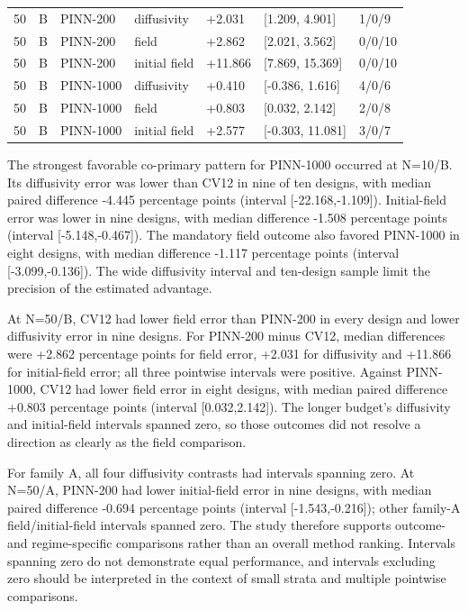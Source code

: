 \documentclass[10pt,a4paper]{article}
\begin{document}
\begin{longtable}{@{}p{}p{}p{}p{}p{}p{}p{}@{}}
50 & B & PINN-200 & diffusivity & +2.031 & [1.209, 4.901] & 1/0/9 \\
50 & B & PINN-200 & field & +2.862 & [2.021, 3.562] & 0/0/10 \\
50 & B & PINN-200 & initial field & +11.866 & [7.869, 15.369] & 0/0/10 \\
50 & B & PINN-1000 & diffusivity & +0.410 & [-0.386, 1.616] & 4/0/6 \\
50 & B & PINN-1000 & field & +0.803 & [0.032, 2.142] & 2/0/8 \\
50 & B & PINN-1000 & initial field & +2.577 & [-0.303, 11.081] & 3/0/7 \\
\end{longtable}
\endgroup

The strongest favorable co-primary pattern for PINN-1000 occurred at N=10/B.
Its diffusivity error was lower than CV12 in nine of ten designs, with median
paired difference -4.445 percentage points (interval [-22.168,-1.109]).
Initial-field error was lower in nine designs, with median difference -1.508
percentage points (interval [-5.148,-0.467]). The mandatory field outcome also
favored PINN-1000 in eight designs, with median difference -1.117 percentage
points (interval [-3.099,-0.136]). The wide diffusivity interval and ten-design
sample limit the precision of the estimated advantage.

At N=50/B, CV12 had lower field error than PINN-200 in every design and lower
diffusivity error in nine designs. For PINN-200 minus CV12, median differences
were +2.862 percentage points for field error, +2.031 for diffusivity and
+11.866 for initial-field error; all three pointwise intervals were positive.
Against PINN-1000, CV12 had lower field error in eight designs, with median
paired difference +0.803 percentage points (interval [0.032,2.142]). The longer
budget's diffusivity and initial-field intervals spanned zero, so those outcomes
did not resolve a direction as clearly as the field comparison.

For family A, all four diffusivity contrasts had intervals spanning zero. At
N=50/A, PINN-200 had lower initial-field error in nine designs, with median
paired difference -0.694 percentage points (interval [-1.543,-0.216]); other
family-A field/initial-field intervals spanned zero. The study therefore supports
outcome- and regime-specific comparisons rather than an overall method ranking.
Intervals spanning zero do not demonstrate equal performance, and intervals
excluding zero should be interpreted in the context of small strata and multiple
pointwise comparisons.
\end{document}
